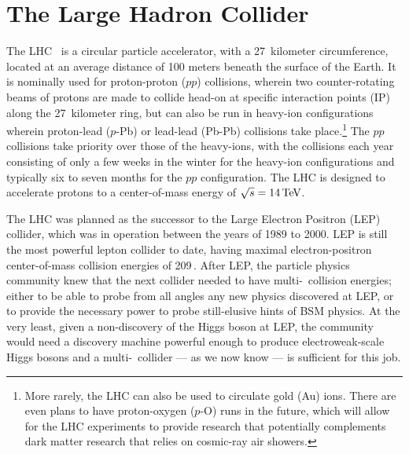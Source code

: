 \section{The Large Hadron Collider}
\label{sec:lhc}

The LHC~\cite{LHCMachine} is a circular particle accelerator, with a 27~kilometer circumference,
located at an average distance of 100 meters beneath the surface of the Earth.
It is nominally used for proton-proton ($pp$) collisions, wherein two counter-rotating
beams of protons are made to collide head-on at specific interaction points (IP) along the 27~kilometer
ring, but can also be run in heavy-ion configurations wherein proton-lead ($p$-Pb) or lead-lead (Pb-Pb)
collisions take place.\footnote{More rarely, the LHC can also be used to circulate gold (Au) ions.
There are even plans to have proton-oxygen ($p$-O) runs in the future, which will allow
for the LHC experiments to provide research that potentially complements dark matter research
that relies on cosmic-ray air showers.}
The $pp$ collisions take priority over those of the heavy-ions, with the collisions each year
consisting of only a few weeks in the winter for the heavy-ion configurations and typically
six to seven months for the $pp$ configuration. The LHC is designed to accelerate protons to a
center-of-mass energy of $\sqrt{s} = 14\,\text{Te\kern -0.1em V}$.

The LHC was planned as the successor to the Large Electron Positron (LEP) collider, which was in operation
between the years of 1989 to 2000. LEP is still the most powerful lepton collider to date, having maximal electron-positron
center-of-mass collision energies of 209\,\GeV.
After LEP, the particle physics community knew that the next collider needed to have multi-\TeV~collision
energies; either to be able to probe from all angles any new physics discovered at LEP, or
to provide the necessary power to probe still-elusive hints of BSM physics. At the very least,
given a non-discovery of the Higgs boson at LEP, the community would need a discovery machine powerful enough
to produce electroweak-scale Higgs bosons and a multi-\TeV~collider --- as we now know --- is sufficient for this job.



